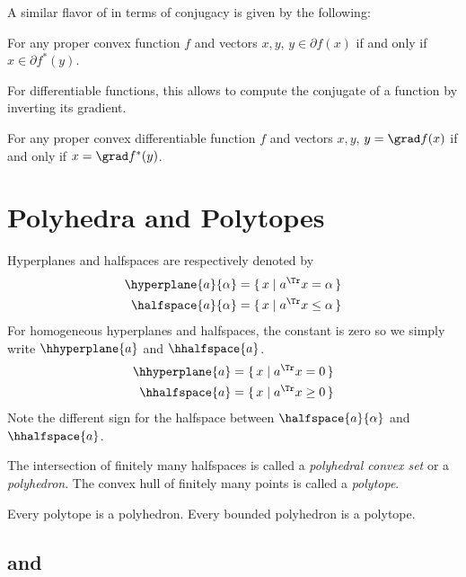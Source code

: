 \documentclass[11pt,twoside,a4paper,openright]{uclouvain-thesis}
\begin{document}
A similar flavor of  in terms of conjugacy is given
by the following:
\begin{myprop}
  \label{prop:conjpartial}
  For any proper convex function $f$ and vectors $x, y$,
  $y \in \partial f(x)$ if and only if $x \in \partial f^*(y)$.
\end{myprop}

For differentiable functions, this allows to compute the conjugate
of a function by inverting its gradient.
\begin{mycoro}
  \label{coro:conjdiff}
  For any proper convex differentiable function $f$ and vectors $x, y$,
  $y = \grad f(x)$ if and only if $x = \grad f^*(y)$.
\end{mycoro}

\section{Polyhedra and Polytopes}
\label{sec:polyhedra}

Hyperplanes and halfspaces are respectively denoted by
\begin{align*}
  \hyperplane{a}{\alpha} = \{\, x \mid a^\Tr x = \alpha \,\}\\
  \halfspace{a}{\alpha} = \{\, x \mid a^\Tr x \le \alpha \,\}
\end{align*}
For homogeneous hyperplanes and halfspaces, the constant is zero so we simply write $\hhyperplane{a}$ and $\hhalfspace{a}$.
\begin{align*}
  \hhyperplane{a} = \{\, x \mid a^\Tr x = 0 \,\}\\
  \hhalfspace{a} = \{\, x \mid a^\Tr x \ge 0 \,\}
\end{align*}
Note the different sign for the halfspace between $\halfspace{a}{\alpha}$ and $\hhalfspace{a}$.

The intersection of finitely many halfspaces is called a \emph{polyhedral convex set} or a \emph{polyhedron}.
The convex hull of finitely many points is called a \emph{polytope}.

\begin{mytheo}
  \label{theo:weylminkowski}
  Every polytope is a polyhedron. Every bounded polyhedron is a polytope.
\end{mytheo}


\subsection{\hrep{} and \vrep{}}
\end{document}
